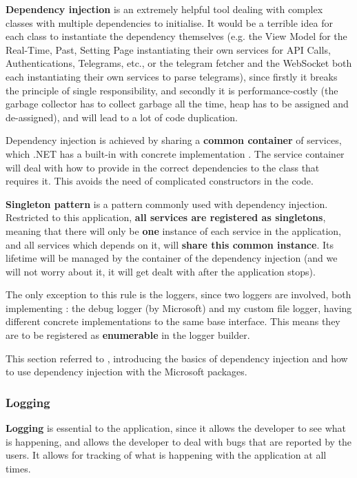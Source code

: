 \textbf{Dependency injection} is an extremely helpful tool dealing with complex classes with multiple dependencies to initialise. It would be a terrible idea for each class to instantiate the dependency themselves (e.g. the View Model for the Real-Time, Past, Setting Page instantiating their own services for API Calls, Authentications, Telegrams, etc., or the telegram fetcher and the WebSocket both each instantiating their own services to parse telegrams), since firstly it breaks the principle of single responsibility, and secondly it is performance-costly (the garbage collector has to collect garbage all the time, heap has to be assigned and de-assigned), and will lead to a lot of code duplication.

Dependency injection is achieved by sharing a \textbf{common container} of services, which .NET has a built-in  with concrete implementation . The service container will deal with how to provide in the correct dependencies to the class that requires it. This avoids the need of complicated constructors in the code.

\textbf{Singleton pattern} is a pattern commonly used with dependency injection. Restricted to this application, \textbf{all services are registered as singletons}, meaning that there will only be \textbf{one} instance of each service in the application, and all services which depends on it, will \textbf{share this common instance}. Its lifetime will be managed by the container of the dependency injection (and we will not worry about it, it will get dealt with after the application stops).

The only exception to this rule is the loggers, since two loggers are involved, both implementing : the debug logger (by Microsoft) and my custom file logger, having different concrete implementations to the same base interface. This means they are to be registered as \textbf{enumerable} in the logger builder.

This section referred to \autocite{dotnet-tutorial-dependency-injection}, introducing the basics of dependency injection and how to use dependency injection with the Microsoft packages.

\subsubsection{Logging}

\textbf{Logging} is essential to the application, since it allows the developer to see what is happening, and allows the developer to deal with bugs that are reported by the users. It allows for tracking of what is happening with the application at all times.

